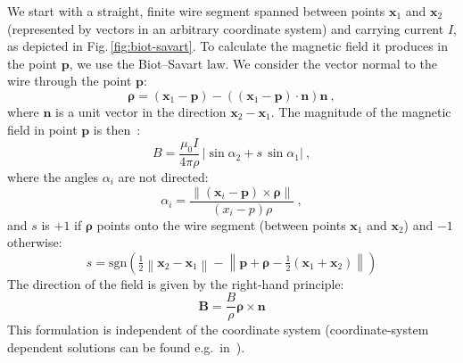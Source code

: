 We start with a straight, finite wire segment spanned between points $\bm{x}_1$ and $\bm{x}_2$ (represented by vectors in an arbitrary coordinate system) and carrying current $I$, as depicted in Fig.\,\ref{fig:biot-savart}. To calculate the magnetic field it produces in the point $\bm{p}$, we use the Biot--Savart law. We consider the vector normal to the wire through the point $\bm{p}$:
\begin{equation}
  \bm{\rho} = (\bm{x}_1 - \bm{p}) - \left( \left( \bm{x}_1 - \bm{p} \right) \cdot \bm{n} \right)\bm{n} \ ,
\end{equation}
where $\bm{n}$ is a unit vector in the direction $\bm{x}_2 -\bm{x}_1$. The magnitude of the magnetic field in point $\bm{p}$ is then~\cite{Griffith}:
\begin{equation}
  \label{eq:biot_savart}
  B = \frac{\mu_0 I}{4 \pi \rho} \, \left| \sin \alpha_2 + s\, \sin \alpha_1 \right| \ ,
\end{equation}
where the angles $\alpha_i$ are not directed:
\begin{equation}
  \alpha_i = \frac{ \left\lVert \left( \bm{x}_i - \bm{p} \right) \times \bm{\rho} \right\rVert }{ (x_i  - p) \rho } \ ,
\end{equation}
and $s$ is $+1$ if $\bm{\rho}$ points onto the wire segment (between points $\bm{x}_1$ and $\bm{x}_2$) and $-1$ otherwise:
\begin{equation}
  s = \mathrm{sgn}\left( \tfrac{1}{2} \left\lVert \bm{x}_2 - \bm{x}_1 \right\rVert -
  \left\lVert \bm{p} + \bm{\rho} - \tfrac{1}{2} \left( \bm{x}_1 + \bm{x}_2 \right) \right\rVert \right)
\end{equation}
The direction of the field is given by the right-hand principle:
\begin{equation}
  \mathbf{B} = \frac{B}{\rho} \bm{\rho} \times \bm{n}
\end{equation}
This formulation is independent of the coordinate system (coordinate-system dependent solutions can be found e.g.\ in~\cite{Grivich2000}).


